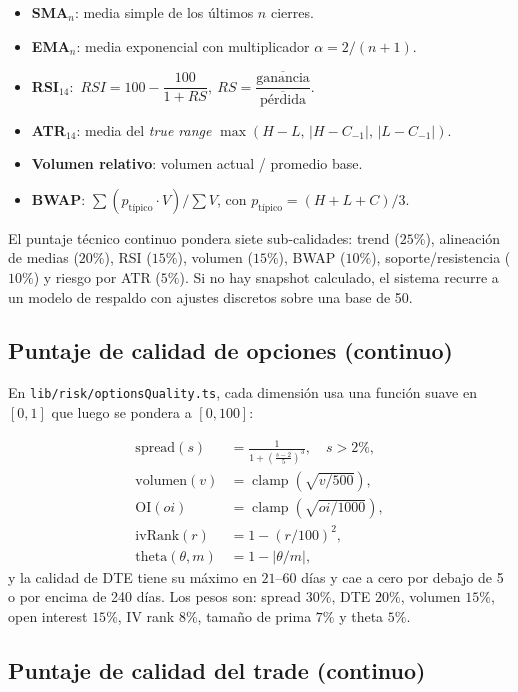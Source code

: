 \documentclass[11pt,letterpaper]{article}
\newcommand{\clp}{\operatorname{clamp}}
\begin{document}
\begin{itemize}[noitemsep]
  \item \textbf{SMA}$_n$: media simple de los últimos $n$ cierres.
  \item \textbf{EMA}$_n$: media exponencial con multiplicador $\alpha = 2/(n+1)$.
  \item \textbf{RSI}$_{14}$: $\,RSI = 100 - \dfrac{100}{1+RS},\ RS = \dfrac{\overline{\text{ganancia}}}{\overline{\text{pérdida}}}$.
  \item \textbf{ATR}$_{14}$: media del \emph{true range}
        $\max(H-L,\,|H-C_{-1}|,\,|L-C_{-1}|)$.
  \item \textbf{Volumen relativo}: volumen actual / promedio base.
  \item \textbf{BWAP}: $\sum (p_{\text{típico}}\cdot V)/\sum V$, con
        $p_{\text{típico}}=(H+L+C)/3$.
\end{itemize}

El puntaje técnico continuo pondera siete sub-calidades:
trend ($25\%$), alineación de medias ($20\%$), RSI ($15\%$), volumen ($15\%$),
BWAP ($10\%$), soporte/resistencia ($10\%$) y riesgo por ATR ($5\%$). Si no hay
snapshot calculado, el sistema recurre a un modelo de respaldo con ajustes
discretos sobre una base de 50.

\subsection{Puntaje de calidad de opciones (continuo)}

En \texttt{lib/risk/optionsQuality.ts}, cada dimensión usa una función suave en
$[0,1]$ que luego se pondera a $[0,100]$:

\begin{align}
\text{spread}(s) &= \frac{1}{1+\left(\frac{s-2}{5}\right)^3}, \quad s>2\%, \\[1mm]
\text{volumen}(v) &= \clp\!\left(\sqrt{v/500}\right), \\
\text{OI}(oi) &= \clp\!\left(\sqrt{oi/1000}\right), \\
\text{ivRank}(r) &= 1 - (r/100)^2, \\
\text{theta}(\theta, m) &= 1 - \left|\theta/m\right|,
\end{align}
y la calidad de DTE tiene su máximo en $21$--$60$ días y cae a cero por debajo de
5 o por encima de 240 días. Los pesos son: spread $30\%$, DTE $20\%$, volumen
$15\%$, open interest $15\%$, IV rank $8\%$, tamaño de prima $7\%$ y theta $5\%$.

\subsection{Puntaje de calidad del trade (continuo)}
\end{document}
